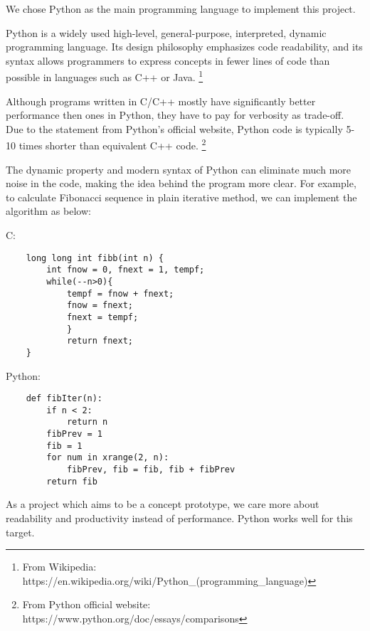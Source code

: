 \documentclass[../main.tex]{subfiles}
\begin{document}
We chose Python as the main programming language to implement this project.

Python is a widely used high-level, general-purpose, interpreted, dynamic programming language. 
Its design philosophy emphasizes code readability, 
and its syntax allows programmers to express concepts in fewer lines of code than possible in languages such as C++ or Java. 
\footnote{From Wikipedia: https://en.wikipedia.org/wiki/Python\_(programming\_language)}

Although programs written in C/C++ mostly have significantly better performance then ones in Python, they have to pay for verbosity as trade-off.
Due to the statement from Python's official website, Python code is typically 5-10 times shorter than equivalent C++ code.
\footnote{From Python official website: https://www.python.org/doc/essays/comparisons}

The dynamic property and modern syntax of Python can eliminate much more noise in the code, making the idea behind the program more clear. For example, to calculate Fibonacci sequence in plain iterative method, we can implement the algorithm as below:

\newpage 

C:
\begin{verbatim}
    long long int fibb(int n) {
        int fnow = 0, fnext = 1, tempf;
        while(--n>0){
            tempf = fnow + fnext;
            fnow = fnext;
            fnext = tempf;
            }
            return fnext;   
    }
\end{verbatim}

Python:
\begin{verbatim}
    def fibIter(n):
        if n < 2:
            return n
        fibPrev = 1
        fib = 1
        for num in xrange(2, n):
            fibPrev, fib = fib, fib + fibPrev
        return fib
\end{verbatim}

As a project which aims to be a concept prototype, we care more about readability and productivity instead of performance. Python works well for this target.
\end{document}
